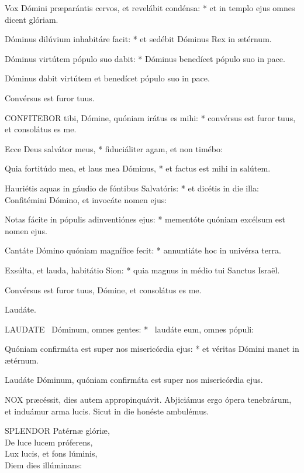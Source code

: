 Vox Dómini præparántis cervos, et revelábit condénsa: * et in templo ejus omnes dicent glóriam.

Dóminus dilúvium inhabitáre facit: * et sedébit Dóminus Rex in ætérnum.

Dóminus virtútem pópulo suo dabit: * Dóminus benedícet pópulo suo in pace.

 Dóminus dabit virtútem et benedícet pópulo suo in pace.

 Convérsus est furor tuus.


\lettrine[lines=2]{C}{ONFITEBOR} tibi, Dómine, quóniam irátus es mihi: * convérsus est furor tuus, et consolátus es me.

Ecce Deus salvátor meus, * fiduciáliter agam, et non timébo:

Quia fortitúdo mea, et laus mea Dóminus, * et factus est mihi in salútem.

Hauriétis aquas in gáudio de fóntibus Salvatóris: * et dicétis in die illa: Confitémini Dómino, et invocáte nomen ejus:

Notas fácite in pópulis adinventiónes ejus: * mementóte quóniam excélsum est nomen ejus.

Cantáte Dómino quóniam magnífice fecit: * annuntiáte hoc in univérsa terra.

Exsúlta, et lauda, habitátio Sion: * quia magnus in médio tui Sanctus Israël.

 Convérsus est furor tuus, Dómine, et consolátus es me.

 Laudáte. \textdagger


\lettrine[lines=2]{L}{AUDATE} \textdagger\ Dóminum, omnes gentes: * \textdaggerdbl\ laudáte eum, omnes pópuli:

Quóniam confirmáta est super nos misericórdia ejus: * et véritas Dómini manet in ætérnum.

 Laudáte Dóminum, quóniam confirmáta est super nos misericórdia ejus.


\lettrine[lines=2]{N}{OX} præcéssit, dies autem appropinquávit. Abjiciámus ergo ópera tenebrárum, et induámur arma lucis. Sicut in die honéste ambulémus.


\lettrine[lines=2]{S}{PLENDOR} Patérnæ glóriæ,\\
De luce lucem próferens,\\
Lux lucis, et fons lúminis,\\
Diem dies illúminans:

